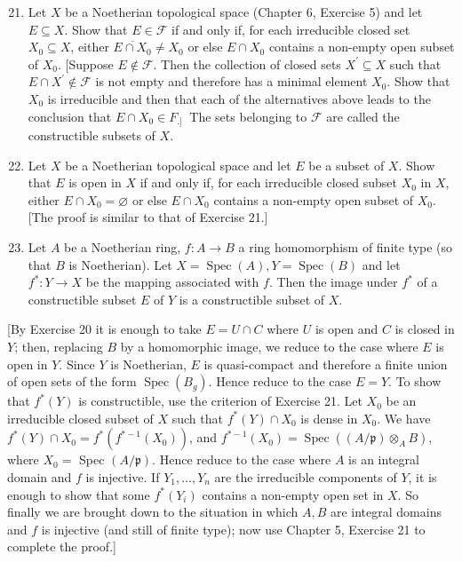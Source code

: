 \documentclass{standalone}
\theoremstyle{definition}
\theoremstyle{remark}
\begin{document}
\begin{enumerate}
  \setcounter{enumi}{20}
  \item Let $X$ be a Noetherian topological space (Chapter 6, Exercise 5) and let $E \subseteq X$. Show that $E \in \mathscr{F}$ if and only if, for each irreducible closed set $X_{0} \subseteq X$, either $\overline{E \cap X_{0}} \neq X_{0}$ or else $E \cap X_{0}$ contains a non-empty open subset of $X_{0}$. [Suppose $E \notin \mathscr{F}$. Then the collection of closed sets $X^{\prime} \subseteq X$ such that $E \cap X^{\prime} \notin \mathscr{F}$ is not empty and therefore has a minimal element $X_{0}$. Show that $X_{0}$ is irreducible and then that each of the alternatives above leads to the conclusion that $E \cap X_{0} \in F_{\text {.] }}$ The sets belonging to $\mathscr{F}$ are called the constructible subsets of $X$.

  \item Let $X$ be a Noetherian topological space and let $E$ be a subset of $X$. Show that $E$ is open in $X$ if and only if, for each irreducible closed subset $X_{0}$ in $X$, either $E \cap X_{0}=\varnothing$ or else $E \cap X_{0}$ contains a non-empty open subset of $X_{0}$. [The proof is similar to that of Exercise 21.]

  \item Let $A$ be a Noetherian ring, $f: A \rightarrow B$ a ring homomorphism of finite type (so that $B$ is Noetherian). Let $X=\operatorname{Spec}(A), Y=\operatorname{Spec}(B)$ and let $f^{*}: Y \rightarrow X$ be the mapping associated with $f$. Then the image under $f^{*}$ of a constructible subset $E$ of $Y$ is a constructible subset of $X$.

\end{enumerate}

[By Exercise 20 it is enough to take $E=U \cap C$ where $U$ is open and $C$ is closed in $Y$; then, replacing $B$ by a homomorphic image, we reduce to the case where $E$ is open in $Y$. Since $Y$ is Noetherian, $E$ is quasi-compact and therefore a finite union of open sets of the form $\operatorname{Spec}\left(B_{g}\right)$. Hence reduce to the case $E=Y$. To show that $f^{*}(Y)$ is constructible, use the criterion of Exercise 21. Let $X_{0}$ be an irreducible closed subset of $X$ such that $f^{*}(Y) \cap X_{0}$ is dense in $X_{0}$. We have $f^{*}(Y) \cap X_{0}=f^{*}\left(f^{*-1}\left(X_{0}\right)\right)$, and $f^{*-1}\left(X_{0}\right)=\operatorname{Spec}\left((A / \mathfrak{p}) \otimes_{A} B\right)$, where $X_{0}=$ Spec $(A / \mathfrak{p})$. Hence reduce to the case where $A$ is an integral domain and $f$ is injective. If $Y_{1}, \ldots, Y_{n}$ are the irreducible components of $Y$, it is enough to show that some $f^{*}\left(Y_{i}\right)$ contains a non-empty open set in $X$. So finally we are brought down to the situation in which $A, B$ are integral domains and $f$ is injective (and still of finite type); now use Chapter 5, Exercise 21 to complete the proof.]
\end{document}
